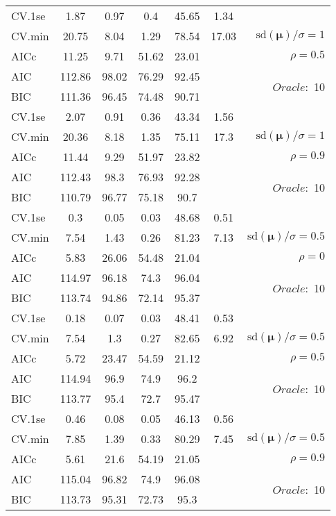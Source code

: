 \begin{table}
\begin{center}
\begin{tabular}{l*{5}{c}|r}
 \hline 
CV.1se & 1.87 & 0.97 & 0.4 & 45.65 & 1.34 & \\
CV.min & 20.75 & 8.04 & 1.29 & 78.54 & 17.03 &  $\mathrm{sd}(\mathbf{\mu})/\sigma=1$ \\
AICc & 11.25 & 9.71 & 51.62 & 23.01 & & $\rho=0.5$ \\
AIC & 112.86 & 98.02 & 76.29 & 92.45 & &  \multirow{2}{*}{$Oracle: $ 10} \\
BIC & 111.36 & 96.45 & 74.48 & 90.71 & &  \\
 \hline 
CV.1se & 2.07 & 0.91 & 0.36 & 43.34 & 1.56 & \\
CV.min & 20.36 & 8.18 & 1.35 & 75.11 & 17.3 &  $\mathrm{sd}(\mathbf{\mu})/\sigma=1$ \\
AICc & 11.44 & 9.29 & 51.97 & 23.82 & & $\rho=0.9$ \\
AIC & 112.43 & 98.3 & 76.93 & 92.28 & &  \multirow{2}{*}{$Oracle: $ 10} \\
BIC & 110.79 & 96.77 & 75.18 & 90.7 & &  \\
 \hline 
CV.1se & 0.3 & 0.05 & 0.03 & 48.68 & 0.51 & \\
CV.min & 7.54 & 1.43 & 0.26 & 81.23 & 7.13 &  $\mathrm{sd}(\mathbf{\mu})/\sigma=0.5$ \\
AICc & 5.83 & 26.06 & 54.48 & 21.04 & & $\rho=0$ \\
AIC & 114.97 & 96.18 & 74.3 & 96.04 & &  \multirow{2}{*}{$Oracle: $ 10} \\
BIC & 113.74 & 94.86 & 72.14 & 95.37 & &  \\
 \hline 
CV.1se & 0.18 & 0.07 & 0.03 & 48.41 & 0.53 & \\
CV.min & 7.54 & 1.3 & 0.27 & 82.65 & 6.92 &  $\mathrm{sd}(\mathbf{\mu})/\sigma=0.5$ \\
AICc & 5.72 & 23.47 & 54.59 & 21.12 & & $\rho=0.5$ \\
AIC & 114.94 & 96.9 & 74.9 & 96.2 & &  \multirow{2}{*}{$Oracle: $ 10} \\
BIC & 113.77 & 95.4 & 72.7 & 95.47 & &  \\
 \hline 
CV.1se & 0.46 & 0.08 & 0.05 & 46.13 & 0.56 & \\
CV.min & 7.85 & 1.39 & 0.33 & 80.29 & 7.45 &  $\mathrm{sd}(\mathbf{\mu})/\sigma=0.5$ \\
AICc & 5.61 & 21.6 & 54.19 & 21.05 & & $\rho=0.9$ \\
AIC & 115.04 & 96.82 & 74.9 & 96.08 & &  \multirow{2}{*}{$Oracle: $ 10} \\
BIC & 113.73 & 95.31 & 72.73 & 95.3 & &  \\
 \hline 
\end{tabular}
\end{center}
\vspace{-1cm}
\end{table}




